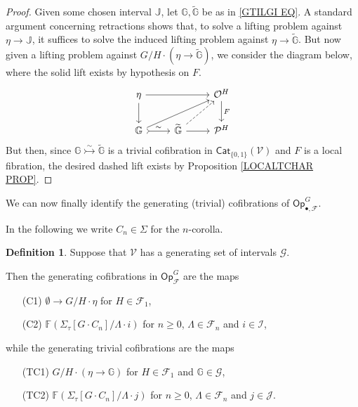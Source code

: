 \documentclass[a4paper,10pt
,draft
]{article}%
\numberwithin{equation}{section}
\numberwithin{figure}{section}
\theoremstyle{definition} %
\newtheorem{definition}[equation]{Definition}%
\newcommand{\F}{\ensuremath{\mathcal F}}
\newcommand{\V}{\ensuremath{\mathcal V}}
\renewcommand{\O}{\ensuremath{\mathcal O}}
\renewcommand{\P}{\ensuremath{\mathcal P}}
\newcommand{\1}{\ensuremath{\mathbbm 1}}%
\begin{document}
\begin{proof}
Given some chosen interval $\mathbb{J}$,
let $\mathbb{G}, \widetilde{\mathbb{G}}$
be as in \eqref{GTILGI EQ}.
A standard argument concerning retractions shows that,
to solve a lifting problem against $\eta \to \mathbb{J}$,
it suffices to solve the induced lifting problem against
$\eta \to \widetilde{\mathbb{G}}$.
But now given a lifting problem against 
$G/H \cdot \left(\eta \to \widetilde{\mathbb{G}}\right)$,
we consider the diagram below, where the solid lift exists by hypothesis on $F$.
\[
\begin{tikzcd}
	\eta \ar{d} \ar{rr}  
&&
	\O^H 	\ar{d}{F}
\\
	\mathbb{G} \ar[rightarrowtail]{r}{\sim} \ar{rru}
&
	\widetilde{\mathbb{G}} \ar{r} \ar[dashed]{ru}
&
	\P^H
\end{tikzcd}
\]
But then, since $\mathbb{G} \overset{\sim}{\rightarrowtail} \widetilde{\mathbb{G}}$
is a trivial cofibration in $\mathsf{Cat}_{\{0,1\}}(\V)$
and $F$ is a local fibration,
the desired dashed lift exists
by Proposition \ref{LOCALTCHAR PROP}.
\end{proof}


We can now finally identify the generating (trivial) cofibrations of
$\mathsf{Op}^G_{\bullet,\F}$.

In the following we write $C_n \in \Sigma$ for the $n$-corolla.


\begin{definition}\label{OPGENCOF DEF}
Suppose that $\V$ has a generating set of intervals $\mathscr{G}$.

Then the generating cofibrations in $\mathsf{Op}^G_{\F}$
are the maps
\begin{itemize}
\item[(C1)] $\emptyset \to G/H \cdot \eta$ for $H \in \F_1$,
\item[(C2)] $\mathbb{F} \left( \Sigma_{\tau}[G \cdot C_n]/\Lambda \cdot i\right)$
for $n \geq 0$, $\Lambda \in \F_n$ and $i \in \mathcal{I}$,
\end{itemize}
while the generating trivial cofibrations are the maps 
\begin{itemize}
\item[(TC1)] 
$G/H \cdot \left(\eta \to \mathbb{G}\right)$ for $H \in \F_1$ and $\mathbb{G} \in \mathscr{G}$,
\item[(TC2)] 
$\mathbb{F} \left( \Sigma_{\tau}[G \cdot C_n]/\Lambda \cdot j\right)$
for $n \geq 0$, $\Lambda \in \F_n$ and $j \in \mathcal{J}$.
\end{itemize}
\end{definition}
\end{document}
